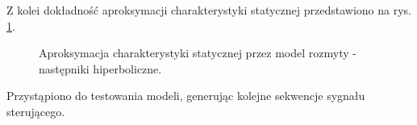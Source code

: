 Z kolei dokładność aproksymacji charakterystyki statycznej przedstawiono na rys. \ref{static_char_wien_nlin}.

\begin{figure}[h!]
\centering
{}
\hfill
{}
\caption{Aproksymacja charakterystyki statycznej przez model rozmyty - następniki hiperboliczne.}
\label{static_char_wien_nlin}
\end{figure}

\newpage

Przystąpiono do testowania modeli, generując kolejne sekwencje sygnału sterującego.

